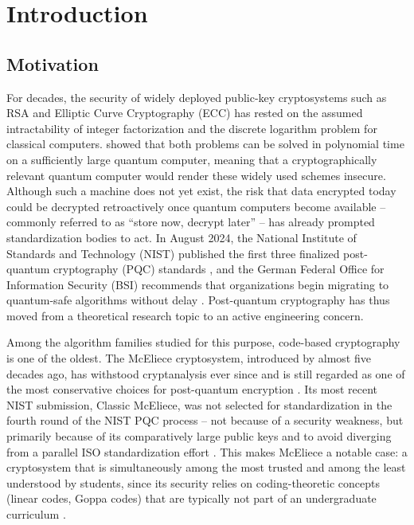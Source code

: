 \section{Introduction}
\label{chap:introduction}

\subsection{Motivation}
\label{sec:motivation}

For decades, the security of widely deployed public-key cryptosystems such as RSA
and Elliptic Curve Cryptography (ECC) has rested on the assumed intractability of
integer factorization and the discrete logarithm problem for classical computers.
\citet{shor1997} showed that both problems can be solved in polynomial time on a
sufficiently large quantum computer, meaning that a cryptographically relevant
quantum computer would render these widely used schemes insecure. Although such a
machine does not yet exist, the risk that data encrypted today could be decrypted
retroactively once quantum computers become available -- commonly referred to as
``store now, decrypt later'' -- has already prompted standardization bodies to act.
In August 2024, the National Institute of Standards and Technology (NIST) published
the first three finalized post-quantum cryptography (PQC) standards
\citep{nist_pqc}, and the German Federal Office for Information Security (BSI)
recommends that organizations begin migrating to quantum-safe algorithms without
delay \citep{bsi_broschuere}. Post-quantum cryptography has thus moved from a
theoretical research topic to an active engineering concern.

Among the algorithm families studied for this purpose, code-based cryptography is
one of the oldest. The McEliece cryptosystem, introduced by \citet{mceliece1978}
almost five decades ago, has withstood cryptanalysis ever since and is still
regarded as one of the most conservative choices for post-quantum encryption
\citep{classic_mceliece_slides2024}. Its most recent NIST submission, Classic
McEliece, was not selected for standardization in the fourth round of the NIST PQC
process -- not because of a security weakness, but primarily because of its
comparatively large public keys and to avoid diverging from a parallel ISO
standardization effort \citep{nist_ir8545}. This makes McEliece a notable case: a
cryptosystem that is simultaneously among the most trusted and among the least
understood by students, since its security relies on coding-theoretic concepts
(linear codes, Goppa codes) that are typically not part of an undergraduate
curriculum \citep{overbeck2009codebased}.

